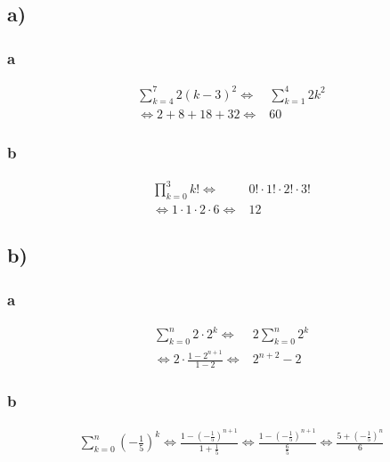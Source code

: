 \documentclass[a4paper, 11pt]{article}
\begin{document}
\subsection{a)}
\label{sec:org7987192}
\subsubsection{a}
\label{sec:orgf348a33}
\begin{align*}
    \sum_{k = 4}^{7} 2(k - 3)^2
    \Leftrightarrow& \sum_{k = 1}^{4} 2k^2 \\
    \Leftrightarrow 2 + 8 + 18 + 32
    \Leftrightarrow& 60
\end{align*}

\subsubsection{b}
\label{sec:org99ea825}
\begin{align*}
    \prod_{k = 0}^{3} k!
    \Leftrightarrow& 0! \cdot 1! \cdot 2! \cdot 3! \\
    \Leftrightarrow 1 \cdot 1 \cdot 2 \cdot 6
    \Leftrightarrow& 12
\end{align*}

\subsection{b)}
\label{sec:orgd979fbc}
\subsubsection{a}
\label{sec:org0622e7f}
\begin{align*}
    \sum_{k = 0}^{n} 2 \cdot 2^k
    \Leftrightarrow& 2 \sum_{k = 0}^{n} 2^k \\
    \Leftrightarrow 2 \cdot \frac{1 - 2^{n + 1}}{1 - 2}
    \Leftrightarrow& 2^{n + 2} - 2
\end{align*}

\subsubsection{b}
\label{sec:orgd5c0914}
\begin{align*}
    \sum_{k = 0}^{n} (-\frac{1}{5})^k
    \Leftrightarrow \frac{1 - (-\frac{1}{5})^{n + 1}}{1 + \frac{1}{5}}
    \Leftrightarrow \frac{1 - (-\frac{1}{5})^{n + 1}}{\frac{6}{5}}
    \Leftrightarrow \frac{5 + (-\frac{1}{5})^n}{6}
\end{align*}
\end{document}
